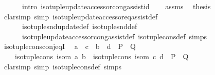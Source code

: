 \begin{isabellebody}
\ \ \ \ \ \ intro{\isacharcolon}{\kern0pt}\ iso{\isacharunderscore}{\kern0pt}tuple{\isacharunderscore}{\kern0pt}update{\isacharunderscore}{\kern0pt}accessor{\isacharunderscore}{\kern0pt}cong{\isacharunderscore}{\kern0pt}assist{\isacharunderscore}{\kern0pt}id{\isacharparenright}{\kern0pt}\isanewline
\ \ \isamarkupfalse%
\ assms\ \isamarkupfalse%
\ {\isacharquery}{\kern0pt}thesis\isanewline
\ \ \ \ \isamarkupfalse%
\ {\isacharparenleft}{\kern0pt}clarsimp\ simp{\isacharcolon}{\kern0pt}\ iso{\isacharunderscore}{\kern0pt}tuple{\isacharunderscore}{\kern0pt}update{\isacharunderscore}{\kern0pt}accessor{\isacharunderscore}{\kern0pt}eq{\isacharunderscore}{\kern0pt}assist{\isacharunderscore}{\kern0pt}def\isanewline
\ \ \ \ \ \ iso{\isacharunderscore}{\kern0pt}tuple{\isacharunderscore}{\kern0pt}snd{\isacharunderscore}{\kern0pt}update{\isacharunderscore}{\kern0pt}def\ iso{\isacharunderscore}{\kern0pt}tuple{\isacharunderscore}{\kern0pt}snd{\isacharunderscore}{\kern0pt}def\isanewline
\ \ \ \ \ \ iso{\isacharunderscore}{\kern0pt}tuple{\isacharunderscore}{\kern0pt}update{\isacharunderscore}{\kern0pt}accessor{\isacharunderscore}{\kern0pt}cong{\isacharunderscore}{\kern0pt}assist{\isacharunderscore}{\kern0pt}def\ iso{\isacharunderscore}{\kern0pt}tuple{\isacharunderscore}{\kern0pt}cons{\isacharunderscore}{\kern0pt}def\ simps{\isacharparenright}{\kern0pt}\isanewline
{}\isamarkupfalse%
%
\endisatagproof
{\isafoldproof}%
%
\isadelimproof
\isanewline
%
\endisadelimproof
\isanewline
{}\isamarkupfalse%
\ iso{\isacharunderscore}{\kern0pt}tuple{\isacharunderscore}{\kern0pt}cons{\isacharunderscore}{\kern0pt}conj{\isacharunderscore}{\kern0pt}eqI{\isacharcolon}{\kern0pt}\isanewline
\ \ {\isachardoublequoteopen}a\ {\isacharequal}{\kern0pt}\ c\ {\isasymand}\ b\ {\isacharequal}{\kern0pt}\ d\ {\isasymand}\ P\ {\isasymlongleftrightarrow}\ Q\ {\isasymLongrightarrow}\isanewline
\ \ \ \ iso{\isacharunderscore}{\kern0pt}tuple{\isacharunderscore}{\kern0pt}cons\ isom\ a\ b\ {\isacharequal}{\kern0pt}\ iso{\isacharunderscore}{\kern0pt}tuple{\isacharunderscore}{\kern0pt}cons\ isom\ c\ d\ {\isasymand}\ P\ {\isasymlongleftrightarrow}\ Q{\isachardoublequoteclose}\isanewline
%
\isadelimproof
\ \ %
\endisadelimproof
%
\isatagproof
{}\isamarkupfalse%
\ {\isacharparenleft}{\kern0pt}clarsimp\ simp{\isacharcolon}{\kern0pt}\ iso{\isacharunderscore}{\kern0pt}tuple{\isacharunderscore}{\kern0pt}cons{\isacharunderscore}{\kern0pt}def\ simps{\isacharparenright}{\kern0pt}%
\endisatagproof
{\isafoldproof}%
%
\isadelimproof
\isanewline

\end{isabellebody}
